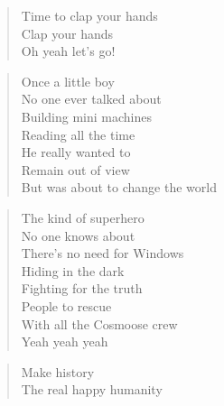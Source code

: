 
\begin{minipage}{0.5\textwidth}
    \begin{verse}
    Time to clap your hands \\
    Clap your hands \\
    Oh yeah let's go!
    \end{verse}

    \begin{verse}
    Once a little boy \\
    No one ever talked about \\
    Building mini machines \\
    Reading all the time \\
    He really wanted to \\
    Remain out of view \\
    But was about to change the world
    \end{verse}

    \begin{verse}
    The kind of superhero \\
    No one knows about \\
    There's no need for Windows \\
    Hiding in the dark \\
    Fighting for the truth \\
    People to rescue \\
    With all the Cosmoose crew \\
    Yeah yeah yeah
    \end{verse}

    \begin{verse}
    Make history \\
    The real happy humanity
    \end{verse}

\end{minipage}

